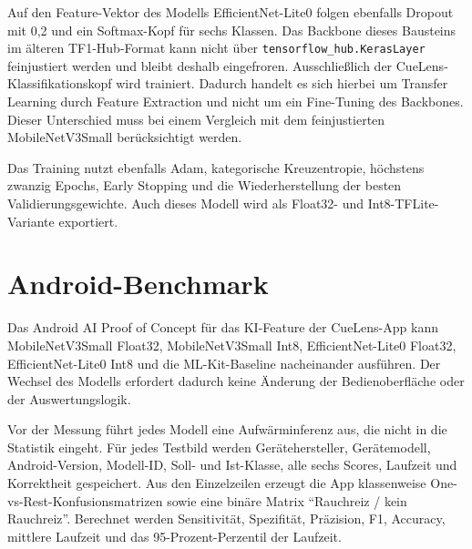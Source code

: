 Auf den Feature-Vektor des Modells EfficientNet-Lite0 folgen ebenfalls Dropout mit 0,2 und ein Softmax-Kopf für sechs Klassen. Das Backbone dieses Bausteins im älteren TF1-Hub-Format kann nicht über \texttt{tensorflow\_hub.KerasLayer} feinjustiert werden und bleibt deshalb eingefroren. Ausschließlich der CueLens-Klassifikationskopf wird trainiert. Dadurch handelt es sich hierbei um Transfer Learning durch Feature Extraction und nicht um ein Fine-Tuning des Backbones. Dieser Unterschied muss bei einem Vergleich mit dem feinjustierten MobileNetV3Small berücksichtigt werden.

Das Training nutzt ebenfalls Adam, kategorische Kreuzentropie, höchstens zwanzig Epochs, Early Stopping und die Wiederherstellung der besten Validierungsgewichte. Auch dieses Modell wird als Float32- und Int8-TFLite-Variante exportiert.

\section{Android-Benchmark}

Das Android AI Proof of Concept für das KI-Feature der CueLens-App kann MobileNetV3Small Float32, MobileNetV3Small Int8, EfficientNet-Lite0 Float32, EfficientNet-Lite0 Int8 und die ML-Kit-Baseline nacheinander ausführen. Der Wechsel des Modells erfordert dadurch keine Änderung der Bedienoberfläche oder der Auswertungslogik.

Vor der Messung führt jedes Modell eine Aufwärminferenz aus, die nicht in die Statistik eingeht. Für jedes Testbild werden Gerätehersteller, Gerätemodell, Android-Version, Modell-ID, Soll- und Ist-Klasse, alle sechs Scores, Laufzeit und Korrektheit gespeichert. Aus den Einzelzeilen erzeugt die App klassenweise One-vs-Rest-Konfusionsmatrizen sowie eine binäre Matrix \enquote{Rauchreiz / kein Rauchreiz}. Berechnet werden Sensitivität, Spezifität, Präzision, F1, Accuracy, mittlere Laufzeit und das 95-Prozent-Perzentil der Laufzeit.
